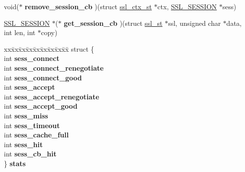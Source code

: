 \begin{DoxyCompactItemize}
void($\ast$ {\bfseries remove\+\_\+session\+\_\+cb} )(struct \hyperlink{structssl__ctx__st}{ssl\+\_\+ctx\+\_\+st} $\ast$ctx, \hyperlink{structssl__session__st}{S\+S\+L\+\_\+\+S\+E\+S\+S\+I\+ON} $\ast$sess)
\item 
\mbox{\label{structssl__ctx__st_ac177321ecedb6c1adc3b8abb703607c2}} 
\hyperlink{structssl__session__st}{S\+S\+L\+\_\+\+S\+E\+S\+S\+I\+ON} $\ast$($\ast$ {\bfseries get\+\_\+session\+\_\+cb} )(struct \hyperlink{structssl__st}{ssl\+\_\+st} $\ast$ssl, unsigned char $\ast$data, int len, int $\ast$copy)
\item 
\mbox{\label{structssl__ctx__st_a2102e17f25763d6a4b14cffc846c7fe5}} 
\begin{tabbing}
xx\=xx\=xx\=xx\=xx\=xx\=xx\=xx\=xx\=\kill
struct \{\\
\>int {\bfseries sess\_connect}\\
\>int {\bfseries sess\_connect\_renegotiate}\\
\>int {\bfseries sess\_connect\_good}\\
\>int {\bfseries sess\_accept}\\
\>int {\bfseries sess\_accept\_renegotiate}\\
\>int {\bfseries sess\_accept\_good}\\
\>int {\bfseries sess\_miss}\\
\>int {\bfseries sess\_timeout}\\
\>int {\bfseries sess\_cache\_full}\\
\>int {\bfseries sess\_hit}\\
\>int {\bfseries sess\_cb\_hit}\\
\} {\bfseries stats}\\


\end{tabbing}
\end{DoxyCompactItemize}
